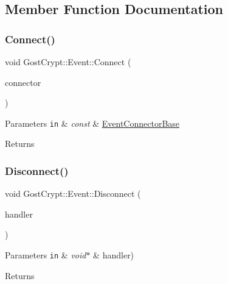 \subsection{Member Function Documentation}
\mbox{\label{class_gost_crypt_1_1_event_afc95f658c559d0a115f6953e8ad5b65c}} 
\subsubsection{\texorpdfstring{Connect()}{Connect()}}
{\footnotesize\ttfamily void Gost\+Crypt\+::\+Event\+::\+Connect (\begin{DoxyParamCaption}\item[{const \hyperlink{class_gost_crypt_1_1_event_connector_base}{Event\+Connector\+Base} \&}]{connector }\end{DoxyParamCaption})}


\begin{DoxyParams}[1]{Parameters}
\mbox{\tt in}  & {\em const} & \hyperlink{class_gost_crypt_1_1_event_connector_base}{Event\+Connector\+Base} \\
\hline
\end{DoxyParams}
\begin{DoxyReturn}{Returns}

\end{DoxyReturn}
\mbox{\label{class_gost_crypt_1_1_event_a37c6fd3137c478d982230a38bcc7e757}} 
\subsubsection{\texorpdfstring{Disconnect()}{Disconnect()}}
{\footnotesize\ttfamily void Gost\+Crypt\+::\+Event\+::\+Disconnect (\begin{DoxyParamCaption}\item[{void $\ast$}]{handler }\end{DoxyParamCaption})}


\begin{DoxyParams}[1]{Parameters}
\mbox{\tt in}  & {\em void$\ast$} & handler) \\
\hline
\end{DoxyParams}
\begin{DoxyReturn}{Returns}

\end{DoxyReturn}
\mbox{\label{class_gost_crypt_1_1_event_a54998cfe707186e98972fa0ea086bd0a}} 
